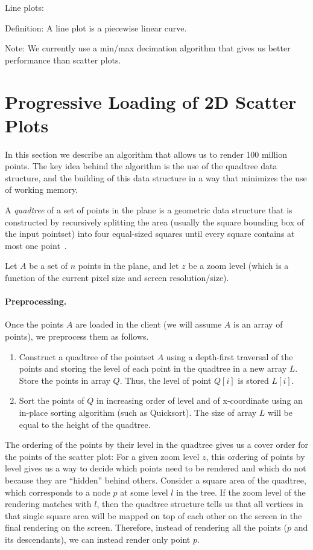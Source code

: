 \documentclass[11pt,a4paper]{article}
\begin{document}
Line plots:

Definition: A line plot is a piecewise linear curve. 

Note: We currently use a min/max decimation algorithm that gives us better performance than scatter plots. 
\fi


\section{Progressive Loading of 2D Scatter Plots}

In this section we describe an algorithm that allows us to render 100 million points.
The key idea behind the algorithm is the use of the quadtree data structure,
and the building of this data structure in a way that minimizes the use of working memory. 


A \emph{quadtree} of a set of points in the plane is a geometric data structure that is constructed by recursively splitting the 
area (usually the square bounding box of the input pointset) into four equal-sized squares
until every square contains at most one point~\cite{finkel1974quad}.

Let $A$ be a set of $n$ points in the plane, and let $z$ be a zoom level 
(which is a function of the current pixel size and screen resolution/size).  %

\paragraph{Preprocessing. } 
Once the points $A$ are loaded in the client (we will assume $A$ is an array of points), we preprocess them as follows.
\begin{enumerate}
\item Construct a quadtree of the pointset $A$ using a depth-first traversal of the points and 
	storing the level of each point in the quadtree in a new array $L$. 
	Store the points in array $Q$.  Thus, the level of point $Q[i]$ is stored $L[i]$.
\item Sort the points of $Q$ in increasing order of level and of x-coordinate using an in-place sorting algorithm (such as Quicksort).
	The size of array $L$ will be equal to the height of the quadtree.
\end{enumerate}

The ordering of the points by their level in the quadtree gives us a cover order for the points of the scatter plot:
For a given zoom level $z$, this ordering of points by level gives us a way to decide which points need to be rendered
and which do not because they are ``hidden'' behind others. 
Consider a square area of the quadtree, which corresponds to a node $p$ at some level $l$ in the tree. 
If the zoom level of the rendering matches with $l$, then the quadtree structure tells us that all vertices in that single square area 
will be mapped on top of each other on the screen in the final rendering on the screen. 
Therefore, instead of rendering all the points ($p$ and its descendants), we can instead render only point $p$. 
\end{document}
